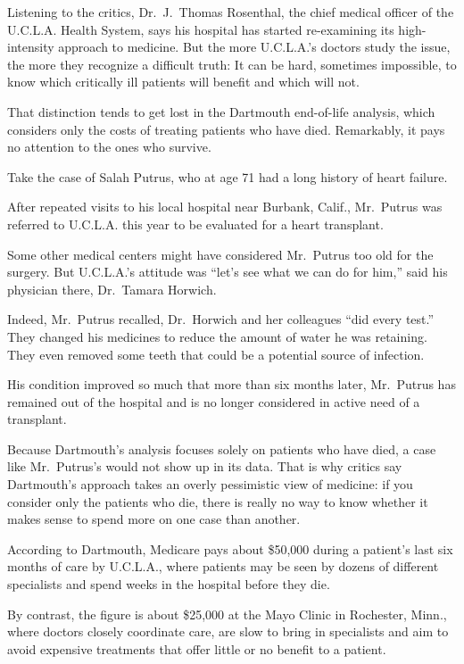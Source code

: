 ﻿\documentclass[12pt]{article}
\begin{document}
Listening to the critics, Dr.~J.~Thomas Rosenthal, the chief medical officer of the U.C.L.A. Health
System, says his hospital has started re-examining its high-intensity approach to medicine. But the
more U.C.L.A.'s doctors study the issue, the more they recognize a difficult truth: It can be hard,
sometimes impossible, to know which critically ill patients will benefit and which will not.

That distinction tends to get lost in the Dartmouth end-of-life analysis, which considers only the
costs of treating patients who have died. Remarkably, it pays no attention to the ones who survive.

Take the case of Salah Putrus, who at age 71 had a long history of heart failure.

After repeated visits to his local hospital near Burbank, Calif., Mr.~Putrus was referred to
U.C.L.A. this year to be evaluated for a heart transplant.

Some other medical centers might have considered Mr.~Putrus too old for the surgery. But U.C.L.A.'s
attitude was ``let's see what we can do for him,'' said his physician there, Dr.~Tamara Horwich.

Indeed, Mr.~Putrus recalled, Dr.~Horwich and her colleagues ``did every test.'' They changed his
medicines to reduce the amount of water he was retaining. They even removed some teeth that could be
a potential source of infection.

His condition improved so much that more than six months later, Mr.~Putrus has remained out of the
hospital and is no longer considered in active need of a transplant.

Because Dartmouth's analysis focuses solely on patients who have died, a case like Mr.~Putrus's
would not show up in its data. That is why critics say Dartmouth's approach takes an overly
pessimistic view of medicine: if you consider only the patients who die, there is really no way to
know whether it makes sense to spend more on one case than another.

According to Dartmouth, Medicare pays about \$50,000 during a patient's last six months of care by
U.C.L.A., where patients may be seen by dozens of different specialists and spend weeks in the
hospital before they die.

By contrast, the figure is about \$25,000 at the Mayo Clinic in Rochester, Minn., where doctors
closely coordinate care, are slow to bring in specialists and aim to avoid expensive treatments that
offer little or no benefit to a patient.
\end{document}
